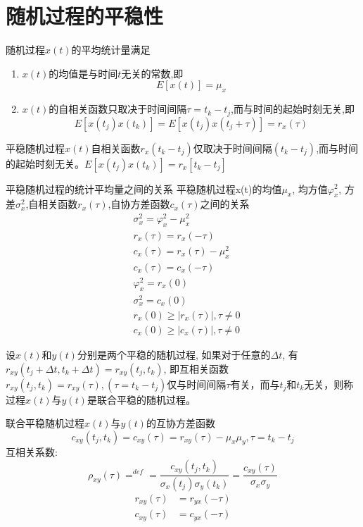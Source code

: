 \section{随机过程的平稳性}

\begin{frame}
\begin{definition}
随机过程$x(t)$的平均统计量满足
\begin{enumerate}
\item $x(t)$的均值是与时间$t$无关的常数,即
\[E[x(t)]=\mu_x\]
\item $x(t)$的自相关函数只取决于时间间隔$\tau=t_k-t_j$,而与时间的起始时刻无关,即
\[E[x(t_j)x(t_k)]=E[x(t_j)x(t_j+\tau)]=r_x(\tau) \]
\end{enumerate}
\end{definition}
平稳随机过程$x(t)$自相关函数$r_x(t_k-t_j)$仅取决于时间间隔$(t_k-t_j)$,而与时间的起始时刻无关。$E[x(t_j)x(t_k)]=r_x[t_k-t_j]$
\end{frame}

\begin{frame}{平稳随机过程的统计平均量之间的关系}
平稳随机过程x(t)的均值$\mu_x$, 均方值$\varphi_x^2$, 方差$\sigma_x^2$,自相关函数$r_x(\tau)$,自协方差函数$c_x(\tau)$之间的关系
\begin{align*}
&\sigma_x^2=\varphi_x^2-\mu_x^2\\
&r_x(\tau)=r_x(-\tau)\\
&c_x(\tau)=r_x(\tau)-\mu_x^2\\
&c_x(\tau)=c_x(-\tau)\\
&\varphi_x^2=r_x(0)\\
&\sigma_x^2=c_x(0)\\
&r_x(0)\ge|r_x(\tau)|, \tau\ne 0\\
&c_x(0)\ge|c_x(\tau)|, \tau\ne 0
\end{align*}
\end{frame}

\begin{frame}
\begin{definition}[联合平稳随机过程]
设$x(t)$和$y(t)$分别是两个平稳的随机过程, 如果对于任意的$\Delta t$, 有$r_{xy}(t_j+\Delta t,t_k+\Delta t)=r_{xy}(t_j,t_k)$, 即互相关函数$r_{xy}(t_j,t_k)=r_{xy}(\tau),(\tau=t_k-t_j)$仅与时间间隔$\tau$有关，而与$t_j$和$t_k$无关，则称过程$x(t)$与$y(t)$是联合平稳的随机过程。
\end{definition}
\begin{block}{联合平稳随机过程$x(t)$与$y(t)$的互协方差函数}
\[c_{xy}(t_j,t_k)=c_{xy}(\tau)=r_{xy}(\tau)-\mu_x\mu_y, \tau=t_k-t_j\]
互相关系数:
\[\rho_{xy}(\tau)\mathop{=}^{def}=\frac{c_{xy}(t_j,t_k)}{\sigma_x(t_j)\sigma_y(t_k)}=\frac{c_{xy}(\tau)}{\sigma_x\sigma_y}\]
\begin{align*}
r_{xy}(\tau)&=r_{yx}(-\tau)\\
c_{xy}(\tau)&=c_{yx}(-\tau)
\end{align*}
\end{block}
\end{frame}

